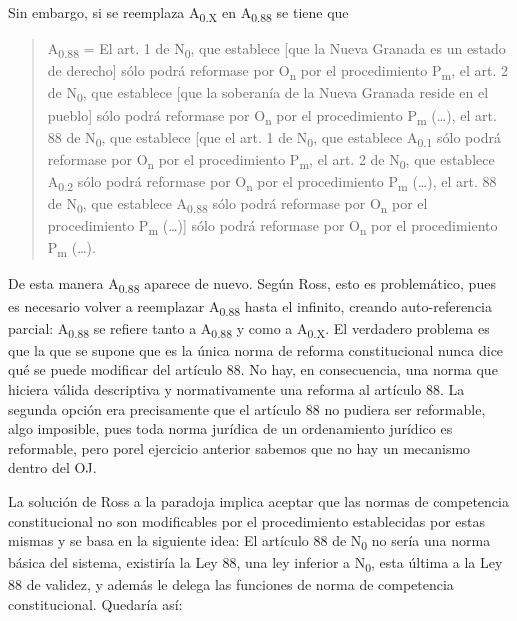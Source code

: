 \documentclass[]{book}
\begin{document}
\begin{refsection}
Sin embargo, si se reemplaza A\textsubscript{0.X} en
A\textsubscript{0.88} se tiene que

\begin{quote}
A\textsubscript{0.88} = El art. 1 de N\textsubscript{0}, que establece
{[}que la Nueva Granada es un estado de derecho{]} sólo podrá reformase
por O\textsubscript{n} por el procedimiento P\textsubscript{m}, el art.
2 de N\textsubscript{0}, que establece {[}que la soberanía de la Nueva
Granada reside en el pueblo{]} sólo podrá reformase por
O\textsubscript{n} por el procedimiento P\textsubscript{m} (\ldots{}),
el art. 88 de N\textsubscript{0}, que establece {[}que el art. 1 de
N\textsubscript{0}, que establece A\textsubscript{0.1} sólo podrá
reformase por O\textsubscript{n} por el procedimiento
P\textsubscript{m}, el art. 2 de N\textsubscript{0}, que establece
A\textsubscript{0.2} sólo podrá reformase por O\textsubscript{n} por el
procedimiento P\textsubscript{m} (\ldots{}), el art. 88 de
N\textsubscript{0}, que establece A\textsubscript{0.88} sólo podrá
reformase por O\textsubscript{n} por el procedimiento P\textsubscript{m}
(\ldots{}){]} sólo podrá reformase por O\textsubscript{n} por el
procedimiento P\textsubscript{m} (\ldots{}).
\end{quote}

De esta manera A\textsubscript{0.88} aparece de nuevo. Según Ross, esto
es problemático, pues es necesario volver a reemplazar
A\textsubscript{0.88} hasta el infinito, creando auto-referencia
parcial: A\textsubscript{0.88} se refiere tanto a A\textsubscript{0.88}
y como a A\textsubscript{0.X}. El verdadero problema es que la que se
supone que es la única norma de reforma constitucional nunca dice qué se
puede modificar del artículo 88. No hay, en consecuencia, una norma que
hiciera válida descriptiva y normativamente una reforma al artículo 88.
La segunda opción era precisamente que el artículo 88 no pudiera ser
reformable, algo imposible, pues toda norma jurídica de un ordenamiento jurídico es reformable, pero porel ejercicio anterior sabemos que no hay un mecanismo dentro del OJ.

La solución de Ross a la paradoja implica aceptar que las normas de
competencia constitucional no son modificables por el procedimiento
establecidas por estas mismas y se basa en la siguiente idea: El
artículo 88 de N\textsubscript{0} no sería una norma básica del sistema,
existiría la Ley 88, una ley inferior a N\textsubscript{0}, esta última
a la Ley 88 de validez, y además le delega las funciones de norma de
competencia constitucional. Quedaría así:


\end{refsection}
\end{document}
